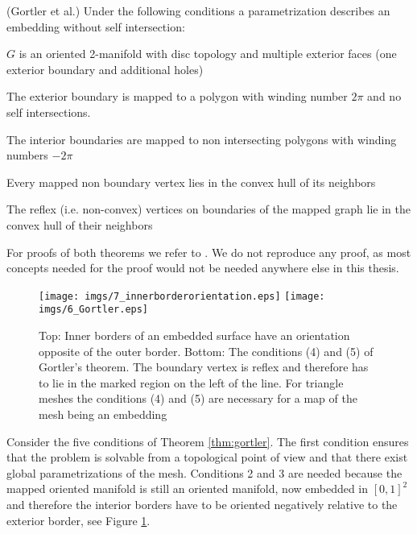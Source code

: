 \begin{thm}\label{thm:gortler}(Gortler et al.) Under the following conditions a parametrization describes an embedding without self intersection:
\begin{packed_enum}
\item $G$ is an oriented 2-manifold with disc topology and multiple exterior faces (one exterior boundary and additional holes)
\item The exterior boundary is mapped to a polygon with winding number $2\pi$ and no self intersections.
\item The interior boundaries are mapped to non intersecting polygons with winding numbers $-2\pi$
\item Every mapped non boundary vertex lies in the convex hull of its neighbors
\item The reflex (i.e. non-convex) vertices on boundaries of the mapped graph lie in the convex hull of their neighbors
\end{packed_enum}
\end{thm}
For proofs of both theorems we refer to \cite{Gortler}. We do not reproduce any proof, as most concepts needed for the proof would not be needed anywhere else in this thesis.


\begin{figure}%
\begin{center}
\texttt{[image: imgs/7\_innerborderorientation.eps]}%
\vspace{0.5cm}
\texttt{[image: imgs/6\_Gortler.eps]}%
\end{center}

\caption{Top: Inner borders of an embedded surface have an orientation opposite of the outer border. Bottom: The conditions (4) and (5) of Gortler's theorem. The boundary vertex is reflex and therefore has to lie in the marked region on the left of the line. For triangle meshes the conditions (4) and (5) are necessary for a map of the mesh being an embedding}%
\label{fig:7_gortler}%
\end{figure}

Consider the five conditions of Theorem \ref{thm:gortler}. The first condition ensures that the problem is solvable from a topological point of view and that there exist global parametrizations of the mesh. Conditions 2 and 3 are needed because the mapped oriented manifold is still an oriented manifold, now embedded in $[0,1]^2$ and therefore the interior borders  have to be oriented negatively relative to the exterior border, see Figure \ref{fig:7_gortler}. 

